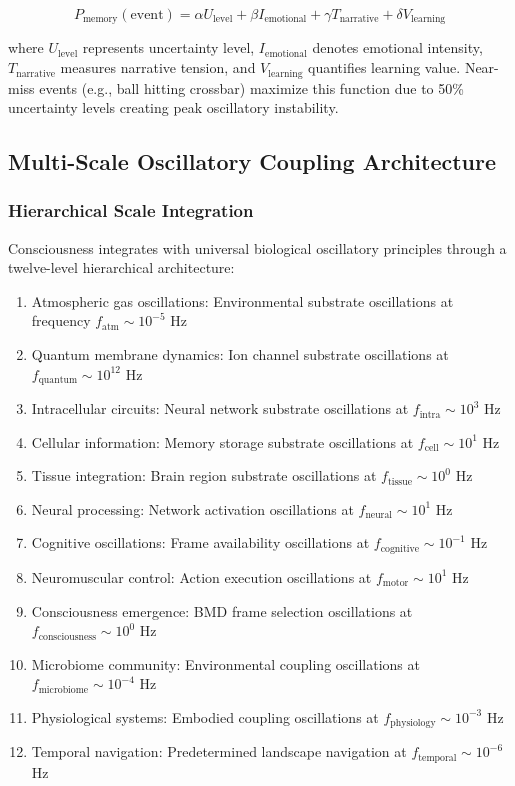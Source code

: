 \documentclass[12pt,a4paper]{article}
\begin{document}
\begin{equation}
P_{\text{memory}}(\text{event}) = \alpha U_{\text{level}} + \beta I_{\text{emotional}} + \gamma T_{\text{narrative}} + \delta V_{\text{learning}}
\end{equation}

where $U_{\text{level}}$ represents uncertainty level, $I_{\text{emotional}}$ denotes emotional intensity, $T_{\text{narrative}}$ measures narrative tension, and $V_{\text{learning}}$ quantifies learning value. Near-miss events (e.g., ball hitting crossbar) maximize this function due to 50\% uncertainty levels creating peak oscillatory instability.

\subsection{Multi-Scale Oscillatory Coupling Architecture}

\subsubsection{Hierarchical Scale Integration}

Consciousness integrates with universal biological oscillatory principles through a twelve-level hierarchical architecture:

\begin{enumerate}
\item Atmospheric gas oscillations: Environmental substrate oscillations at frequency $f_{\text{atm}} \sim 10^{-5}$ Hz
\item Quantum membrane dynamics: Ion channel substrate oscillations at $f_{\text{quantum}} \sim 10^{12}$ Hz
\item Intracellular circuits: Neural network substrate oscillations at $f_{\text{intra}} \sim 10^{3}$ Hz
\item Cellular information: Memory storage substrate oscillations at $f_{\text{cell}} \sim 10^{1}$ Hz
\item Tissue integration: Brain region substrate oscillations at $f_{\text{tissue}} \sim 10^{0}$ Hz
\item Neural processing: Network activation oscillations at $f_{\text{neural}} \sim 10^{1}$ Hz
\item Cognitive oscillations: Frame availability oscillations at $f_{\text{cognitive}} \sim 10^{-1}$ Hz
\item Neuromuscular control: Action execution oscillations at $f_{\text{motor}} \sim 10^{1}$ Hz
\item Consciousness emergence: BMD frame selection oscillations at $f_{\text{consciousness}} \sim 10^{0}$ Hz
\item Microbiome community: Environmental coupling oscillations at $f_{\text{microbiome}} \sim 10^{-4}$ Hz
\item Physiological systems: Embodied coupling oscillations at $f_{\text{physiology}} \sim 10^{-3}$ Hz
\item Temporal navigation: Predetermined landscape navigation at $f_{\text{temporal}} \sim 10^{-6}$ Hz
\end{enumerate}
\end{document}
